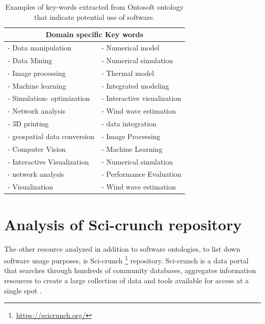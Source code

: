 \begin{table}[h!]
	\begin{center}
		\caption{Examples of key-words extracted from Ontosoft ontology that indicate potential use of software.}
		\label{tab:table1}
		\begin{tabular}{|l|l|} %
			
			\hline
			\multicolumn{2}{|c|}{Domain specific Key words }\\
			\hline
			-	Data manipulation & -	Numerical model \\
			-	Data Mining       & -	Numerical simulation \\
			-	Image processing  & -   Thermal model \\
			-	Machine learning  & -   Integrated modeling \\
			-	Simulation- optimization & - Interactive visualization \\
			-	Network analysis & - Wind wave estimation \\
			- 3D printing         & - data integration \\
			- geospatial data conversion & - Image Processing \\
			- Computer Vision & - Machine Learning \\
			- Interactive Visualization & - Numerical simulation \\
			- network analysis & - Performance Evaluation \\
			- Visualization & -  Wind wave estimation \\
			\hline
		\end{tabular}
	\end{center}
\end{table}
\section{Analysis of Sci-crunch repository }
\label{sec:purpose:Sci}
The other resource analyzed in addition to software ontologies, to list down software usage purposes, is Sci-crunch \footnote{\url{https://scicrunch.org/}} repository. Sci-crunch is a data portal that searches through hundreds of community databases, aggregates information resources to create a large collection of data and tools available for access at a single spot \citep{grethe2016scicrunch}. \\

